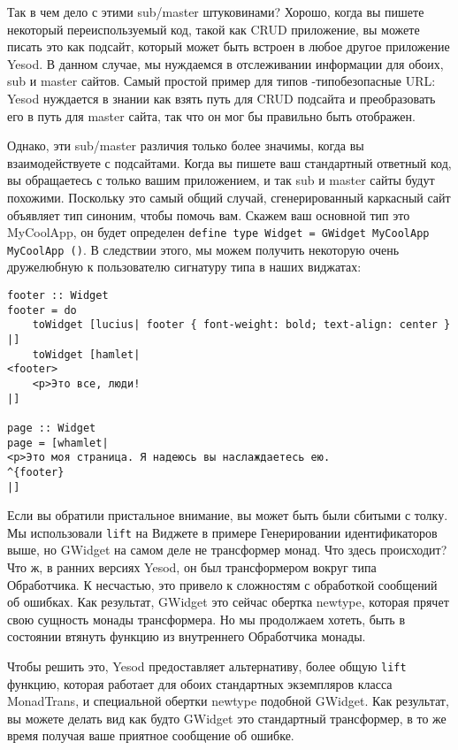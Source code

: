 Так в чем дело с этими sub/master штуковинами? Хорошо, когда вы пишете некоторый переиспользуемый код, такой как CRUD приложение, вы можете писать это как подсайт, который может быть встроен в любое другое приложение Yesod. В данном случае, мы нуждаемся в отслеживании информации для обоих, sub и master сайтов. Самый простой пример для типов -типобезопасные URL: Yesod нуждается в знании как взять путь для CRUD подсайта и преобразовать его в путь для master сайта, так что он мог бы правильно быть отображен.

Однако, эти sub/master различия только более значимы, когда вы взаимодействуете с подсайтами. Когда вы пишете ваш стандартный ответный код, вы обращаетесь с только вашим приложением, и так sub и master сайты будут похожими. Поскольку это самый общий случай, сгенерированный каркасный сайт объявляет тип синоним, чтобы помочь вам. Скажем ваш основной тип это MyCoolApp, он будет определен \lstinline'define type Widget = GWidget MyCoolApp MyCoolApp ()'. В следствии этого, мы можем получить некоторую очень дружелюбную к пользователю сигнатуру типа в наших виджатах:

\begin{lstlisting}
footer :: Widget
footer = do
    toWidget [lucius| footer { font-weight: bold; text-align: center } |]
    toWidget [hamlet|
<footer>
    <p>Это все, люди!
|]

page :: Widget
page = [whamlet|
<p>Это моя страница. Я надеюсь вы наслаждаетесь ею.
^{footer}
|]
\end{lstlisting}

Если вы обратили пристальное внимание, вы может быть были сбитыми с толку. Мы использовали \lstinline'lift' на Виджете в примере Генерировании идентификаторов выше, но GWidget на самом деле не трансформер монад. Что здесь происходит? Что ж, в ранних версиях Yesod, он был трансформером вокруг типа Обработчика. К несчастью, это привело к сложностям с обработкой сообщений об ошибках. Как результат, GWidget это сейчас обертка newtype, которая прячет свою сущность монады трансформера. Но мы продолжаем хотеть, быть в состоянии втянуть функцию из внутреннего Обработчика монады.

Чтобы решить это, Yesod предоставляет альтернативу, более общую \lstinline'lift' функцию, которая работает для обоих стандартных экземпляров класса MonadTrans, и специальной обертки newtype подобной GWidget. Как результат, вы можете делать вид как будто GWidget это стандартный трансформер, в то же время получая ваше приятное сообщение об ошибке.

